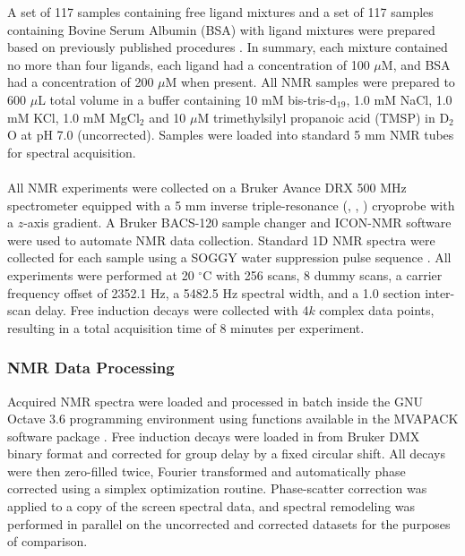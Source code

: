 \begin{doublespace}
A set of 117 samples containing free ligand mixtures and a set of 117 samples
containing Bovine Serum Albumin (BSA) with ligand mixtures were prepared based
on previously published procedures \cite{powers:ddt2008,mercier:cchts2009}.
In summary, each mixture contained no more than four ligands, each ligand had
a concentration of 100 $\mu$M, and BSA had a concentration of 200 $\mu$M when
present. All NMR samples were prepared to 600 $\mu$L total volume in a buffer
containing 10 mM bis-tris-d$_{19}$, 1.0 mM NaCl, 1.0 mM KCl, 1.0 mM MgCl$_2$
and 10 $\mu$M trimethylsilyl propanoic acid (TMSP) in D$_2$O at pH 7.0
(uncorrected). Samples were loaded into standard 5 mm NMR tubes for spectral
acquisition.
\\\\
All NMR experiments were collected on a Bruker Avance DRX 500 MHz spectrometer
equipped with a 5 mm inverse triple-resonance (\hnmr{}, \cnmr{}, \nnmr{})
cryoprobe with a $z$-axis gradient. A Bruker BACS-120 sample changer and
ICON-NMR software were used to automate NMR data collection. Standard 1D
\hnmr{} NMR spectra were collected for each sample using a SOGGY water
suppression pulse sequence \cite{hwang:jmr1995,nguyen:jmr2007}. All
experiments were performed at 20 $^\circ$C with 256 scans, 8 dummy scans,
a carrier frequency offset of 2352.1 Hz, a 5482.5 Hz spectral width, and a 1.0
section inter-scan delay. Free induction decays were collected with 4$k$
complex data points, resulting in a total acquisition time of 8 minutes per
experiment.
\end{doublespace}

\subsubsection{NMR Data Processing}

\begin{doublespace}
Acquired NMR spectra were loaded and processed in batch inside the GNU Octave
3.6 programming environment \cite{eaton2008} using functions available in the
MVAPACK software package \cite{worley:acscb2014}. Free induction decays were
loaded in from Bruker DMX binary format and corrected for group delay by a
fixed circular shift. All decays were then zero-filled twice, Fourier
transformed and automatically phase corrected using a simplex optimization
routine. Phase-scatter correction was applied to a copy of the screen spectral
data, and spectral remodeling was performed in parallel on the uncorrected and
corrected datasets for the purposes of comparison.
\end{doublespace}

